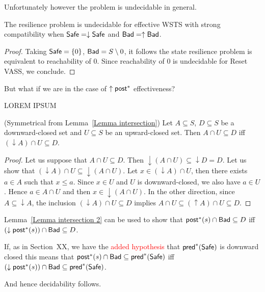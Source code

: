 Unfortunately however the problem is undecidable in general.

\begin{theorem}
The resilience problem is undecidable for effective WSTS with  strong  compatibility 
when
$\textsf{Safe}=\downarrow \textsf{Safe}$
and $\textsf{Bad}=\uparrow \textsf{Bad}$.
\end{theorem}

\begin{proof}
Taking $\textsf{Safe} = \{ 0 \}$, $\textsf{Bad} = S \setminus 0$, it follows the state resilience problem is equivalent
to reachability of $0$. Since reachability of $0$ is undecidable for Reset VASS, we conclude.
\end{proof}

But what if we are in the case of $\uparrow \textsf{post}^*$ effectiveness?

LOREM IPSUM \\

\begin{lemma}(Symmetrical from Lemma~\ref{Lemma intersection})\label{Lemma intersection 2}
Let $A \subseteq S$, $D \subseteq S$ be a downward-closed set and $U \subseteq S$ be an upward-closed set. 
Then $A \cap U \subseteq D$  iff $ (\downarrow  A) \cap U \subseteq D$.
\end{lemma}


\begin{proof}
Let us suppose that $A \cap U \subseteq D$. Then ${\downarrow (A \cap U)} \subseteq {\downarrow D} = D$.
Let us show that $({\downarrow A}) \cap U \subseteq {\downarrow (A \cap U)}$.
Let $x \in ({\downarrow A}) \cap U$, then there exists $a \in A$ such that $x \leq a$.
Since $x \in U$ and $U$ is downward-closed, we also have $a \in U$.
Hence $a \in A \cap U$ and then $x \in { \downarrow (A \cap U)}$.
In the other direction,
since $A \subseteq {\downarrow A}$, the inclusion
$({\downarrow  A}) \cap U \subseteq D$ implies
$A \cap U \subseteq ({\uparrow  A}) \cap U \subseteq D$.
\end{proof}

Lemma~\ref{Lemma intersection 2} can be used to show that
$\textsf{post}^*(s) \cap \textsf{Bad} \subseteq D$  iff $ (\downarrow  \textsf{post}^*(s)) \cap \textsf{Bad} \subseteq D$.

If, as in Section~XX, we have the \textcolor{red}{added hypothesis}
that
$\textsf{pred}^*(\textsf{Safe})$ is downward closed this means that
$\textsf{post}^*(s) \cap \textsf{Bad} \subseteq \textsf{pred}^*(\textsf{Safe})$  iff $ (\downarrow  \textsf{post}^*(s)) \cap \textsf{Bad} \subseteq \textsf{pred}^*(\textsf{Safe})$.

And hence decidability follows.




